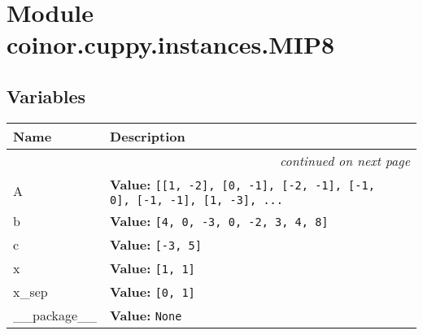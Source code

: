 %
%
%


\section{Module coinor.cuppy.instances.MIP8}

    \label{coinor:cuppy:instances:MIP8}


  \subsection{Variables}

    \vspace{-1cm}
\hspace{\varindent}\begin{longtable}{|p{\varnamewidth}|p{\vardescrwidth}|l}
\cline{1-2}
\cline{1-2} \centering \textbf{Name} & \centering \textbf{Description}& \\
\cline{1-2}
\endhead\cline{1-2}\multicolumn{3}{r}{\small\textit{continued on next page}}\\\endfoot\cline{1-2}
\endlastfoot\raggedright A\- & \raggedright \textbf{Value:} 
{\tt \texttt{[}\texttt{[}1\texttt{, }-2\texttt{]}\texttt{, }\texttt{[}0\texttt{, }-1\texttt{]}\texttt{, }\texttt{[}-2\texttt{, }-1\texttt{]}\texttt{, }\texttt{[}-1\texttt{, }0\texttt{]}\texttt{, }\texttt{[}-1\texttt{, }-1\texttt{]}\texttt{, }\texttt{[}1\texttt{, }-3\texttt{]}\texttt{, }\texttt{...}}&\\
\cline{1-2}
\raggedright b\- & \raggedright \textbf{Value:} 
{\tt \texttt{[}4\texttt{, }0\texttt{, }-3\texttt{, }0\texttt{, }-2\texttt{, }3\texttt{, }4\texttt{, }8\texttt{]}}&\\
\cline{1-2}
\raggedright c\- & \raggedright \textbf{Value:} 
{\tt \texttt{[}-3\texttt{, }5\texttt{]}}&\\
\cline{1-2}
\raggedright x\- & \raggedright \textbf{Value:} 
{\tt \texttt{[}1\texttt{, }1\texttt{]}}&\\
\cline{1-2}
\raggedright x\-\_\-s\-e\-p\- & \raggedright \textbf{Value:} 
{\tt \texttt{[}0\texttt{, }1\texttt{]}}&\\
\cline{1-2}
\raggedright \_\-\_\-p\-a\-c\-k\-a\-g\-e\-\_\-\_\- & \raggedright \textbf{Value:} 
{\tt None}&\\
\cline{1-2}
\end{longtable}

